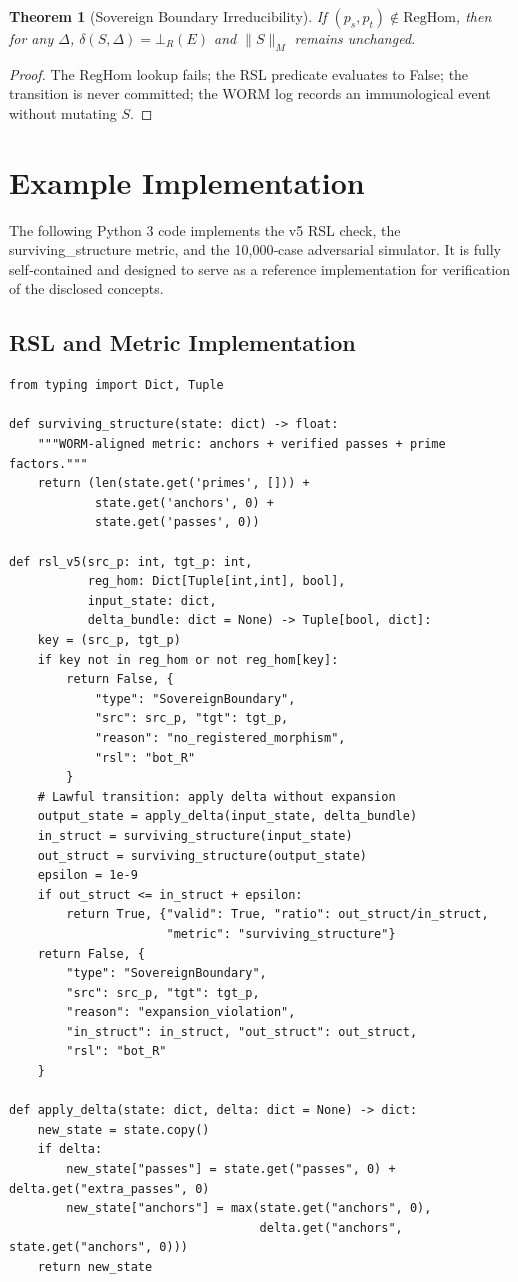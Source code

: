 \documentclass[11pt,a4paper]{article}
\newtheorem{theorem}{Theorem}[section]
\theoremstyle{definition}
\theoremstyle{remark}
\begin{document}
\begin{theorem}[Sovereign Boundary Irreducibility]
If $(p_s, p_t) \notin \text{RegHom}$, then for any $\Delta$, $\delta(S, \Delta) = \bot_R(E)$ and $\|S\|_M$ remains unchanged.
\end{theorem}
\begin{proof}
The RegHom lookup fails; the RSL predicate evaluates to False; the transition is never committed; the WORM log records an immunological event without mutating $S$.
\end{proof}

\section{Example Implementation}
\label{sec:implementation}
The following Python 3 code implements the v5 RSL check, the surviving\_structure metric, and the 10,000‑case adversarial simulator. It is fully self‑contained and designed to serve as a reference implementation for verification of the disclosed concepts.

\subsection{RSL and Metric Implementation}
\label{subsec:rsl_code}
\begin{lstlisting}[style=pythonstyle, caption={RSL v5 and surviving\_structure metric}, label=lst:rsl]
from typing import Dict, Tuple

def surviving_structure(state: dict) -> float:
    """WORM-aligned metric: anchors + verified passes + prime factors."""
    return (len(state.get('primes', [])) +
            state.get('anchors', 0) +
            state.get('passes', 0))

def rsl_v5(src_p: int, tgt_p: int,
           reg_hom: Dict[Tuple[int,int], bool],
           input_state: dict,
           delta_bundle: dict = None) -> Tuple[bool, dict]:
    key = (src_p, tgt_p)
    if key not in reg_hom or not reg_hom[key]:
        return False, {
            "type": "SovereignBoundary",
            "src": src_p, "tgt": tgt_p,
            "reason": "no_registered_morphism",
            "rsl": "bot_R"
        }
    # Lawful transition: apply delta without expansion
    output_state = apply_delta(input_state, delta_bundle)
    in_struct = surviving_structure(input_state)
    out_struct = surviving_structure(output_state)
    epsilon = 1e-9
    if out_struct <= in_struct + epsilon:
        return True, {"valid": True, "ratio": out_struct/in_struct,
                      "metric": "surviving_structure"}
    return False, {
        "type": "SovereignBoundary",
        "src": src_p, "tgt": tgt_p,
        "reason": "expansion_violation",
        "in_struct": in_struct, "out_struct": out_struct,
        "rsl": "bot_R"
    }

def apply_delta(state: dict, delta: dict = None) -> dict:
    new_state = state.copy()
    if delta:
        new_state["passes"] = state.get("passes", 0) + delta.get("extra_passes", 0)
        new_state["anchors"] = max(state.get("anchors", 0),
                                   delta.get("anchors", state.get("anchors", 0)))
    return new_state
\end{lstlisting}
\end{document}
